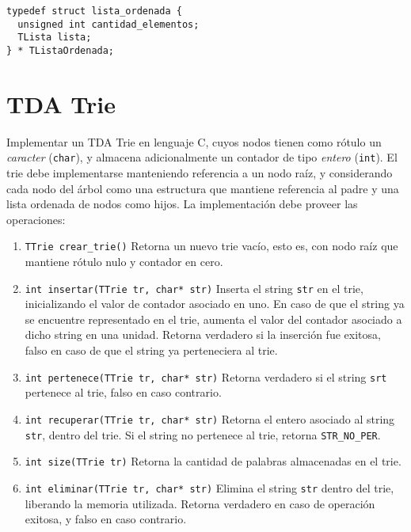 \documentclass[12pt,a4paper]{article}
\begin{document}
\begin{verbatim}
typedef struct lista_ordenada {
  unsigned int cantidad_elementos;
  TLista lista;
} * TListaOrdenada;
\end{verbatim}

\section{TDA Trie}

Implementar un TDA Trie en lenguaje C, cuyos nodos tienen como rótulo un \emph{caracter} (\texttt{char}), y almacena adicionalmente un contador de tipo \emph{entero} (\texttt{int}). El trie debe implementarse manteniendo referencia a un nodo raíz, y considerando cada nodo del árbol como una estructura que mantiene referencia al padre y una lista ordenada de nodos como hijos. La implementación debe proveer las operaciones:

\begin{enumerate}
	
	\item \texttt{TTrie crear\_trie()} Retorna un nuevo trie vacío, esto es, con nodo raíz que mantiene rótulo nulo y contador en cero.
	
	\item \texttt{int insertar(TTrie tr, char* str)} Inserta el string \texttt{str} en el trie, inicializando el valor de contador asociado en uno. En caso de que el string ya se encuentre representado en el trie, aumenta el valor del contador asociado a dicho string en una unidad. Retorna verdadero si la inserción fue exitosa, falso en caso de que el string ya perteneciera al trie.

	\item \texttt{int pertenece(TTrie tr, char* str)} Retorna verdadero si el string \texttt{srt} pertenece al trie, falso en caso contrario.
	
	\item \texttt{int recuperar(TTrie tr, char* str)} Retorna el entero asociado al string \texttt{str}, dentro del trie. Si el string no pertenece al trie, retorna \texttt{STR\_NO\_PER}.

	\item \texttt{int size(TTrie tr)} Retorna la cantidad de palabras almacenadas en el trie.
	
	\item \texttt{int eliminar(TTrie tr, char* str)} Elimina el string \texttt{str} dentro del trie, liberando la memoria utilizada. Retorna verdadero en caso de operación exitosa, y falso en caso contrario.
		
\end{enumerate}
\end{document}
